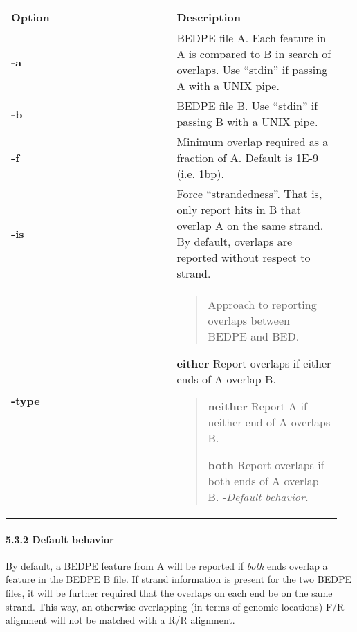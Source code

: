 \documentclass[letterpaper,10pt,english]{sphinxmanual}
\begin{document}
\begin{tabular}{|p{0.475\linewidth}|p{0.475\linewidth}|}
\hline
\textbf{
Option
} & \textbf{
Description
}\\\hline

\textbf{-a}
 & 
BEDPE file A. Each feature in A is compared to B in search of overlaps. Use ``stdin'' if passing A with a UNIX pipe.
\\\hline

\textbf{-b}
 & 
BEDPE file B. Use ``stdin'' if passing B with a UNIX pipe.
\\\hline

\textbf{-f}
 & 
Minimum overlap required as a fraction of A. Default is 1E-9 (i.e. 1bp).
\\\hline

\textbf{-is}
 & 
Force ``strandedness''. That is, only report hits in B that overlap A on the same strand. By default, overlaps are reported without respect to strand.
\\\hline

\textbf{-type}
 & \begin{quote}

Approach to reporting overlaps between BEDPE and BED.
\end{quote}

\begin{DUlineblock}{0em}
\item[] \textbf{either} Report overlaps if either ends of A overlap B.
\end{DUlineblock}
\begin{quote}

\begin{DUlineblock}{0em}
\item[] \textbf{neither} Report A if neither end of A overlaps B.
\end{DUlineblock}

\begin{DUlineblock}{0em}
\item[] \textbf{both} Report overlaps if both ends of A overlap B.   -\emph{Default behavior.}
\end{DUlineblock}
\end{quote}
\\\hline
\end{tabular}



\paragraph{5.3.2 Default behavior}
\label{content/pairToPair:default-behavior}
By default, a BEDPE feature from A will be reported if \emph{both} ends overlap a feature in the BEDPE B
file. If strand information is present for the two BEDPE files, it will be further required that the
overlaps on each end be on the same strand. This way, an otherwise overlapping (in terms of genomic
locations) F/R alignment will not be matched with a R/R alignment.
\end{document}
